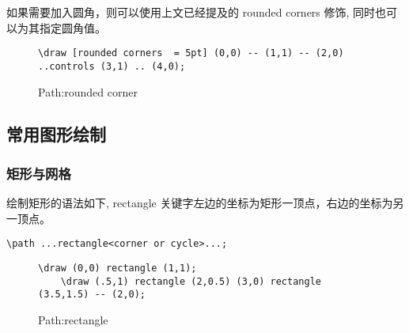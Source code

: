 如果需要加入圆角，则可以使用上文已经提及的 rounded corners 修饰, 同时也可以为其指定圆角值。

\begin{figure}[H]
    \centering
    \begin{minipage}{0.35\linewidth}
        \centering
    \end{minipage}
    \begin{minipage}{0.55\linewidth}
        \begin{lstlisting}[style = latex-side]
    \draw [rounded corners  = 5pt] (0,0) -- (1,1) -- (2,0) ..controls (3,1) .. (4,0); 
        \end{lstlisting}
    \end{minipage}
    \caption{Path:rounded corner}
\end{figure}

\subsection{常用图形绘制}
\subsubsection{矩形与网格}

绘制矩形的语法如下, rectangle 关键字左边的坐标为矩形一顶点，右边的坐标为另一顶点。
\begin{lstlisting}[style = latex]
    \path ...rectangle<corner or cycle>...;
\end{lstlisting}

\begin{figure}[H]
    \centering
    \begin{minipage}{0.35\linewidth}
        \centering
    \end{minipage}
    \begin{minipage}{0.55\linewidth}
        \begin{lstlisting}[style = latex-side]
    \draw (0,0) rectangle (1,1);
    \draw (.5,1) rectangle (2,0.5) (3,0) rectangle (3.5,1.5) -- (2,0);
        \end{lstlisting}
    \end{minipage}
    \caption{Path:rectangle}
\end{figure}

